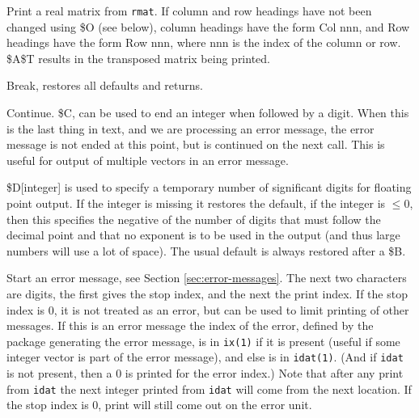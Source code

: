\documentclass[12pt]{article}
\begin{document}
\begin{description}\setlength{\itemsep}{-2pt}
\item[A] Print a real matrix from {\tt rmat}.  If column and row headings have
  not been changed using \$O (see below), column headings have the form Col nnn,
  and Row headings have the form Row nnn, where nnn is the index of the column
  or row.  \$A\$T results in the transposed matrix being printed.

\item[B] Break, restores all defaults and returns.

\item[C] Continue. \$C, can be used to end an integer when followed by a digit.
  When this is the last thing in text, and we are processing an error message,
  the error message is not ended at this point, but is continued on the next
  call.  This is useful for output of multiple vectors in an error message.

\item[D] \$D[integer] is used to specify a temporary number of significant
  digits for floating point output.  If the integer is missing it restores the
  default, if the integer is $\leq 0$, then this specifies the negative of the
  number of digits that must follow the decimal point and that no exponent is to
  be used in the output (and thus large numbers will use a lot of space).  The
  usual default is always restored after a \$B.

\item[E] Start an error message, see Section \ref{sec:error-messages}.  The next
  two characters are digits, the first gives the stop index, and the next the
  print index.  If the stop index is 0, it is not treated as an error, but can
  be used to limit printing of other messages.  If this is an error message the
  index of the error, defined by the package generating the error message, is in
  {\tt ix(1)} if it is present (useful if some integer vector is part of the
  error message), and else is in {\tt idat(1)}.  (And if {\tt idat} is not
  present, then a 0 is printed for the error index.)  Note that after any print
  from {\tt idat} the next integer printed from {\tt idat} will come from the
  next location.  If the stop index is 0, print will still come out on the error
  unit.


\end{description}
\end{document}
